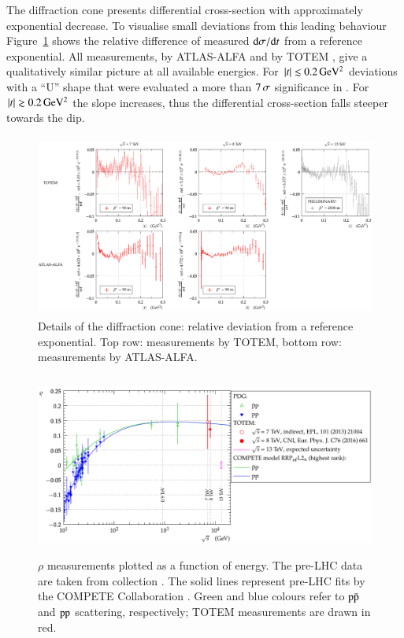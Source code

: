 \documentclass{webofc}
\def\un#1{\,{\rm #1}}
\def\d{{\rm d}}
\begin{document}
The diffraction cone presents differential cross-section with approximately exponential decrease. To visualise small deviations from this leading behaviour Figure~\ref{f:es non-exp} shows the relative difference of measured $\d\sigma/\d t$ from a reference exponential. All measurements, by ATLAS-ALFA \cite{alfa-si-el-7tev,alfa-si-el-8tev} and by TOTEM \cite{totem-si-el-7tev,totem-el-non-exp-8tev}, give a qualitatively similar picture at all available energies. For $|t| \lesssim 0.2\un{GeV^2}$ deviations with a ``U'' shape that were evaluated a more than $7\un{\sigma}$ significance in \cite{totem-el-non-exp-8tev}. For $|t| \gtrsim 0.2\un{GeV^2}$ the slope increases, thus the differential cross-section falls steeper towards the dip.

\begin{figure}[h]
\centering
\includegraphics[height=6cm,clip]{fig/es_t_dist_rel_cmp.pdf}
\vskip-4mm
\caption{Details of the diffraction cone: relative deviation from a reference exponential. Top row: measurements by TOTEM, bottom row: measurements by ATLAS-ALFA.}
\label{f:es non-exp}
\end{figure}

\begin{figure}[h]
\centering
\includegraphics[height=6cm,clip]{fig/es_rho_vs_s.pdf}
\vskip-4mm
\caption{$\rho$ measurements plotted as a function of energy. The pre-LHC data are taken from collection \cite{pdg}. The solid lines represent pre-LHC fits by the COMPETE Collaboration \cite{compete}. Green and blue colours refer to $\rm p\bar p$ and $\rm pp$ scattering, respectively; TOTEM measurements are drawn in red.}
\label{f:es rho}
\end{figure}
\end{document}
